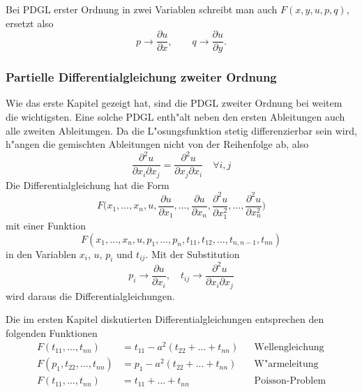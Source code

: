 Bei PDGL erster Ordnung in zwei Variablen schreibt man auch
$F(x,y,u,p,q)$, ersetzt also
\[
p\to\frac{\partial u}{\partial x},
\qquad
q\to\frac{\partial u}{\partial y}.
\]

\subsubsection{Partielle Differentialgleichung zweiter Ordnung}
Wie das erste Kapitel gezeigt hat, sind die PDGL zweiter Ordnung bei weitem
die wichtigsten. Eine solche PDGL enth"alt neben den ersten Ableitungen
auch alle zweiten Ableitungen. Da die L"osungsfunktion stetig differenzierbar
sein wird, h"angen die gemischten Ableitungen nicht von der Reihenfolge
ab, also
\[
\frac{\partial^2 u}{\partial x_i\partial x_j}
=
\frac{\partial^2 u}{\partial x_j\partial x_i}
\quad\forall i,j
\]
Die Differentialgleichung hat die Form
\[
F\biggl(x_1,\dots,x_n,u,
\frac{\partial u}{\partial x_1},\dots,\frac{\partial u}{\partial x_n},
\frac{\partial^2 u}{\partial x_1^2},\dots,\frac{\partial^2 u}{\partial x_n^2}\biggr)
\]
mit einer Funktion
\[
F(x_1,\dots,x_n,u,p_1,\dots,p_n,t_{11},t_{12},\dots,t_{n,n-1},t_{nn})
\]
in den Variablen $x_i$, $u$, $p_i$ und $t_{ij}$. Mit der Substitution
\[
p_i\to \frac{\partial u}{\partial x_i}
,\quad
t_{ij}\to \frac{\partial^2 u}{\partial x_i\partial x_j}
\]
wird daraus die Differentialgleichungen.

Die im ersten Kapitel diskutierten Differentialgleichungen entsprechen den folgenden 
Funktionen
\begin{align*}
F(t_{11},\dots,t_{nn})&=t_{11}-a^2(t_{22}+\dots+t_{nn})&&\text{Wellengleichung}
\\
F(p_1,t_{22},\dots,t_{nn})&=p_1-a^2(t_{22}+\dots+t_{nn})&&\text{W"armeleitung}
\\
F(t_{11},\dots,t_{nn})&=t_{11}+\dots+t_{nn}&&\text{Poisson-Problem}
\end{align*}

